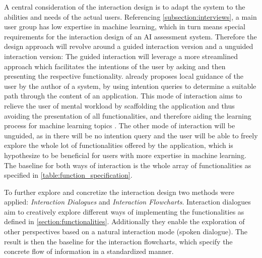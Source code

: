 \documentclass[11pt,a4paper,english]{scrreprt}
\begin{document}
A central consideration of the interaction design is to adapt the system to the abilities and needs of the actual users. Referencing \autoref{subsection:interviews}, a main user group has low expertise in machine learning, which in turn means special requirements for the interaction design of an AI assessment system. Therefore the design approach will revolve around a guided interaction version and a unguided interaction version: The guided interaction will leverage a more streamlined approach which facilitates the intentions of the user by asking and then presenting the respective functionality. \textcite{trigg_guided_1988} already proposes local guidance of the user by the author of a system, by using intention queries to determine a suitable path through the content of an application. This mode of interaction aims to relieve the user of mental workload by scaffolding the application and thus avoiding the presentation of all functionalities, and therefore aiding the learning process for machine learning topics \parencite{soloway_learner_1994}. The other mode of interaction will be unguided, as in there will be no intention query and the user will be able to freely explore the whole lot of functionalities offered by the application, which is hypothesize to be beneficial for users with more expertise in machine learning. The baseline for both ways of interaction is the whole array of functionalities as specified in \autoref{table:function_specification}.

To further explore and concretize the interaction design two methods were applied: \textit{Interaction Dialogues} and \textit{Interaction Flowcharts}. Interaction dialogues aim to creatively explore different ways of implementing the functionalities as defined in \autoref{section:functionalities}. Additionally they enable the exploration of other perspectives based on a natural interaction mode (spoken dialogue). The result is then the baseline for the interaction flowcharts, which specify the concrete flow of information in a standardized manner.
\end{document}

